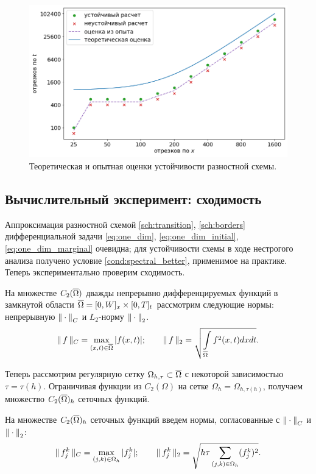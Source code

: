 \begin{figure}[!tp]
    \centering
    \includegraphics[width=\textwidth]{figures/stability_bounds.png}
    \vspace{-0.7cm}
    \caption{Теоретическая и опытная оценки устойчивости разностной схемы.}
    \label{fig:stability_bounds}
\end{figure}


\subsection{Вычислительный эксперимент: сходимость}

Аппроксимация разностной схемой \eqref{sch:transition}, \eqref{sch:borders} дифференциальной задачи \eqref{eq:one_dim}, \eqref{eq:one_dim_initial}, \eqref{eq:one_dim_marginal} очевидна; для устойчивости схемы в ходе нестрогого анализа получено условие \eqref{cond:spectral_better}, применимое на практике. Теперь экспериментально проверим сходимость.

На множестве $C_2({\overline{\Omega}})$ дважды непрерывно дифференцируемых функций в замкнутой области ${\overline{\Omega}} = [0, W]_x \times [0, T]_t$ рассмотрим следующие нормы: непрерывную ${\| \cdot \|}_C$ и $L_2$-норму ${\| \cdot \|}_2$.
$$\| \, f \, \|_C = \max \limits_{(x, t) \in {\overline{\Omega}}} |f(x, t)|; \qquad \| \, f \, \|_2 = \sqrt{\int \limits_{{\overline{\Omega}}} f^2(x, t) dx dt} {\text{.}}$$

Теперь рассмотрим регулярную сетку $\Omega_{h, \tau} \subset {\overline{\Omega}}$ с некоторой зависимостью $\tau = \tau(h)$. Ограничивая функции из $C_2(\Omega)$ на сетке $\Omega_h = \Omega_{h, \tau(h)}$, получаем множество $C_2({\overline{\Omega}})_h$ сеточных функций.

На множестве $C_2({\overline{\Omega}})_h$ сеточных функций введем нормы, согласованные с ${\| \cdot \|}_C$ и ${\| \cdot \|}_2$:
$$\| \, f_j^k \, \|_C = \max \limits_{(j, k) \in \Omega_h} |f_j^k|; \qquad \| \, f_j^k \, \|_2 = \sqrt{h \tau \sum \limits_{(j, k) \in \Omega_h} (f_j^k)^2} {\text{.}}$$

